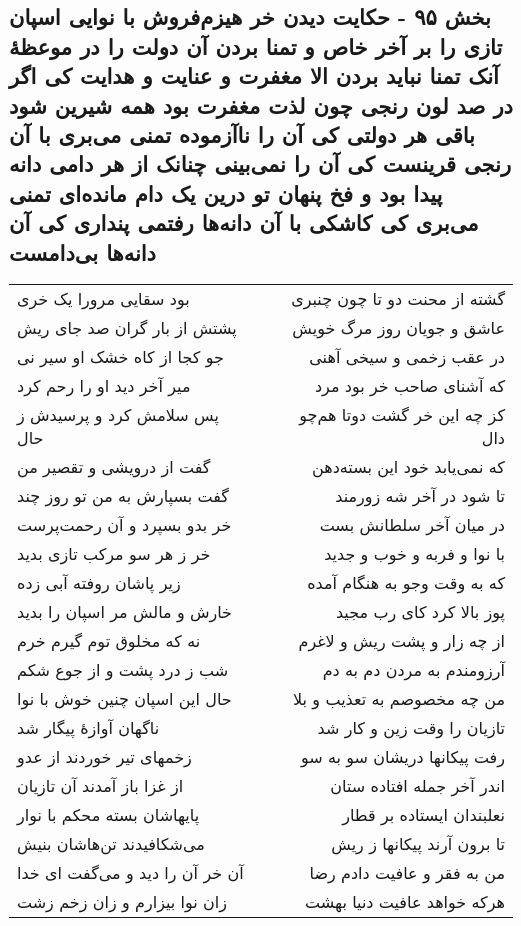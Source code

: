 \begin{center}
\section*{بخش ۹۵ - حکایت دیدن خر هیزم‌فروش با نوایی اسپان تازی را بر آخر  خاص و تمنا بردن آن دولت را در موعظهٔ آنک تمنا نباید بردن الا  مغفرت و عنایت و هدایت کی اگر در صد لون رنجی چون لذت  مغفرت بود همه شیرین شود باقی هر دولتی کی آن را ناآزموده تمنی  می‌بری با آن رنجی قرینست کی آن را نمی‌بینی چنانک از هر دامی  دانه پیدا بود و فخ پنهان تو درین یک دام مانده‌ای تمنی می‌بری کی  کاشکی با آن دانه‌ها رفتمی پنداری کی آن دانه‌ها بی‌دامست}
\label{sec:sh095}
\begin{longtable}{l p{0.5cm} r}
بود سقایی مرورا یک خری
&&
گشته از محنت دو تا چون چنبری
\\
پشتش از بار گران صد جای ریش
&&
عاشق و جویان روز مرگ خویش
\\
جو کجا از کاه خشک او سیر نی
&&
در عقب زخمی و سیخی آهنی
\\
میر آخر دید او را رحم کرد
&&
که آشنای صاحب خر بود مرد
\\
پس سلامش کرد و پرسیدش ز حال
&&
کز چه این خر گشت دوتا هم‌چو دال
\\
گفت از درویشی و تقصیر من
&&
که نمی‌یابد خود این بسته‌دهن
\\
گفت بسپارش به من تو روز چند
&&
تا شود در آخر شه زورمند
\\
خر بدو بسپرد و آن رحمت‌پرست
&&
در میان آخر سلطانش بست
\\
خر ز هر سو مرکب تازی بدید
&&
با نوا و فربه و خوب و جدید
\\
زیر پاشان روفته آبی زده
&&
که به وقت وجو به هنگام آمده
\\
خارش و مالش مر اسپان را بدید
&&
پوز بالا کرد کای رب مجید
\\
نه که مخلوق توم گیرم خرم
&&
از چه زار و پشت ریش و لاغرم
\\
شب ز درد پشت و از جوع شکم
&&
آرزومندم به مردن دم به دم
\\
حال این اسپان چنین خوش با نوا
&&
من چه مخصوصم به تعذیب و بلا
\\
ناگهان آوازهٔ پیگار شد
&&
تازیان را وقت زین و کار شد
\\
زخمهای تیر خوردند از عدو
&&
رفت پیکانها دریشان سو به سو
\\
از غزا باز آمدند آن تازیان
&&
اندر آخر جمله افتاده ستان
\\
پایهاشان بسته محکم با نوار
&&
نعلبندان ایستاده بر قطار
\\
می‌شکافیدند تن‌هاشان بنیش
&&
تا برون آرند پیکانها ز ریش
\\
آن خر آن را دید و می‌گفت ای خدا
&&
من به فقر و عافیت دادم رضا
\\
زان نوا بیزارم و زان زخم زشت
&&
هرکه خواهد عافیت دنیا بهشت
\\
\end{longtable}
\end{center}
